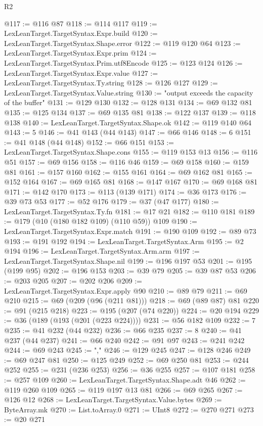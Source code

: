 \begin{lexlean}{R2}
\begin{coremodule}
{{{{{{{{{{{{{{{{{{{{{{{{{{{{{{{{{{{{{{{{{{{{{{@117 := @116 @87
@118 := @114 @117
@119 := LexLeanTarget.TargetSyntax.Expr.build
@120 := LexLeanTarget.TargetSyntax.Shape.error
@122 := @119 @120 @64
@123 := LexLeanTarget.TargetSyntax.Expr.prim
@124 := LexLeanTarget.TargetSyntax.Prim.utf8Encode
@125 := @123 @124
@126 := LexLeanTarget.TargetSyntax.Expr.value
@127 := LexLeanTarget.TargetSyntax.Ty.string
@128 := @126 @127
@129 := LexLeanTarget.TargetSyntax.Value.string
@130 := "output exceeds the capacity of the buffer"
@131 := @129 @130
@132 := @128 @131
@134 := @69 @132 @81
@135 := @125 @134
@137 := @69 @135 @81
@138 := @122 @137
@139 := @118 @138
@140 := LexLeanTarget.TargetSyntax.Shape.ok
@142 := @119 @140 @64
@143 := 5
@146 := @41 @143 (@44 @143)
@147 := @66 @146
@148 := 6
@151 := @41 @148 (@44 @148)
@152 := @66 @151
@153 := LexLeanTarget.TargetSyntax.Shape.cons
@155 := @119 @153 @13
@156 := @116 @51
@157 := @69 @156
@158 := @116 @46
@159 := @69 @158
@160 := @159 @81
@161 := @157 @160
@162 := @155 @161
@164 := @69 @162 @81
@165 := @152 @164
@167 := @69 @165 @81
@168 := @147 @167
@170 := @69 @168 @81
@171 := @142 @170
@173 := @113 (@139 @171)
@174 := @36 @173
@176 := @39 @73 @53
@177 := @52 @176
@179 := @37 (@47 @177)
@180 := LexLeanTarget.TargetSyntax.Ty.fn
@181 := @17 @21
@182 := @110 @181
@189 := @179 (@10 (@180 @182 @109) (@110 @59)) @109
@190 := LexLeanTarget.TargetSyntax.Expr.match
@191 := @190 @109
@192 := @89 @73
@193 := @191 @192
@194 := LexLeanTarget.TargetSyntax.Arm
@195 := @2 @194
@196 := LexLeanTarget.TargetSyntax.Arm.arm
@197 := LexLeanTarget.TargetSyntax.Shape.nil
@199 := @196 @197 @53
@201 := @195 (@199 @95)
@202 := @196 @153
@203 := @39 @79
@205 := @39 @87 @53
@206 := @203 @205
@207 := @202 @206
@209 := LexLeanTarget.TargetSyntax.Expr.apply @90
@210 := @89 @79
@211 := @69 @210
@215 := @69 (@209 (@96 (@211 @81)))
@218 := @69 (@89 @87) @81
@220 := @91 (@215 @218)
@223 := @195 (@207 (@74 @220))
@224 := @20 @194
@229 := @36 (@189 (@193 (@201 (@223 @224))))
@231 := @56 @182 @109
@232 := 7
@235 := @41 @232 (@44 @232)
@236 := @66 @235
@237 := 8
@240 := @41 @237 (@44 @237)
@241 := @66 @240
@242 := @91 @97
@243 := @241 @242
@244 := @69 @243
@245 := ","
@246 := @129 @245
@247 := @128 @246
@249 := @69 @247 @81
@250 := @125 @249
@252 := @69 @250 @81
@253 := @244 @252
@255 := @231 (@236 @253)
@256 := @36 @255
@257 := @107 @181
@258 := @257 @109
@260 := LexLeanTarget.TargetSyntax.Shape.adt @46
@262 := @119 @260 @109
@265 := @119 @197 @13 @81
@266 := @69 @265
@267 := @126 @12
@268 := LexLeanTarget.TargetSyntax.Value.bytes
@269 := ByteArray.mk
@270 := List.toArray.{0}
@271 := UInt8
@272 := @270 @271
@273 := @20 @271
}}}}}}}}}}}}}}}}}}}}}}}}}}}}}}}}}}}}}}}}}}}}}}
\end{coremodule}
\end{lexlean}

